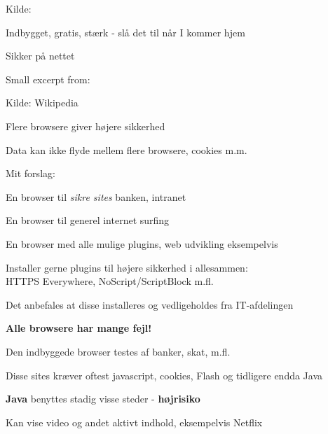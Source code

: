 \documentclass[20pt,landscape,a4paper,footrule]{foils}
\begin{document}
Kilde:



\centerline{Indbygget, gratis, stærk - slå det til når I kommer hjem}


\mytitlepage
{Sikker på nettet}




Small excerpt from:\\



Kilde: Wikipedia




\begin{list1}
\item Flere browsere giver højere sikkerhed
\item Data kan ikke flyde mellem flere browsere, cookies m.m.
\item Mit forslag:
\begin{list2}
\item En browser til \emph{sikre sites} banken, intranet
\item En browser til generel internet surfing
\item En browser med alle mulige plugins, web udvikling eksempelvis
\end{list2}
\item Installer gerne plugins til højere sikkerhed i allesammen:\\
HTTPS Everywhere, NoScript/ScriptBlock m.fl.

\end{list1}

\vskip 1cm
\centerline{Det anbefales at disse installeres og vedligeholdes fra IT-afdelingen}


\vskip 1cm
\centerline{\bf\Large Alle browsere har mange fejl!}


\begin{list2}
\item Den indbyggede browser testes af banker, skat, m.fl.
\item Disse sites kræver oftest javascript, cookies, Flash og tidligere endda Java
\item {\bf Java} benyttes stadig visse steder - {\bf højrisiko}
\item Kan vise video og andet aktivt indhold, eksempelvis Netflix
\end{list2}
\end{document}
